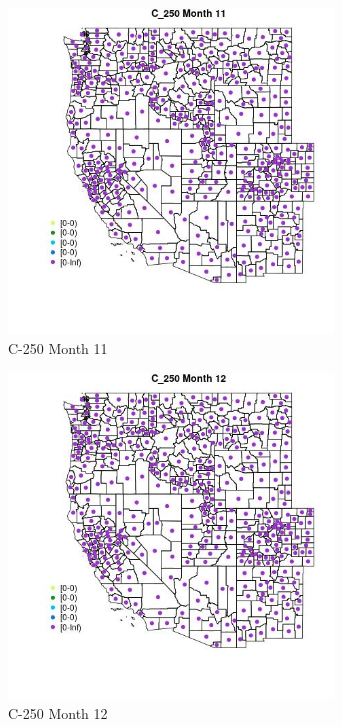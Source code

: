 \begin{figure} 
\centering  
\includegraphics[width=0.77\textwidth]{Code_Outputs/df_report_ML_predictors_CountyCentroid_Locations_Dates_2008-01-01to2018-12-31_MapObsMo11C_250.jpg} 
\caption{\label{fig:df_report_ML_predictors_CountyCentroid_Locations_Dates_2008-01-01to2018-12-31MapObsMo11C_250}C-250 Month 11} 
\end{figure} 
 

\begin{figure} 
\centering  
\includegraphics[width=0.77\textwidth]{Code_Outputs/df_report_ML_predictors_CountyCentroid_Locations_Dates_2008-01-01to2018-12-31_MapObsMo12C_250.jpg} 
\caption{\label{fig:df_report_ML_predictors_CountyCentroid_Locations_Dates_2008-01-01to2018-12-31MapObsMo12C_250}C-250 Month 12} 
\end{figure} 
 

